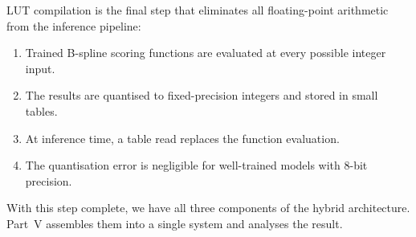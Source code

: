 LUT compilation is the final step that eliminates all floating-point
arithmetic from the inference pipeline:

\begin{enumerate}
  \item Trained B-spline scoring functions are evaluated at every
    possible integer input.
  \item The results are quantised to fixed-precision integers and
    stored in small tables.
  \item At inference time, a table read replaces the function
    evaluation.
  \item The quantisation error is negligible for well-trained models
    with 8-bit precision.
\end{enumerate}

With this step complete, we have all three components of the hybrid
architecture. Part~V assembles them into a single system and analyses
the result.
